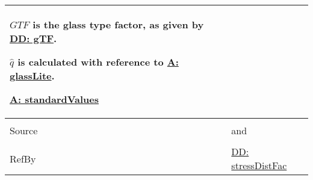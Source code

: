 \documentclass[12pt]{article}
\begin{document}
\begin{minipage}{\textwidth}
\begin{tabular}{>{\raggedright}p{}>{\raggedright\arraybackslash}p{}}
        $GTF$ is the glass type factor, as given by \hyperref[DD:gTF]{DD: gTF}.
        
        $\hat{q}$ is calculated with reference to \hyperref[assumpGL]{A: glassLite}.
        
        \hyperref[assumpSV]{A: standardValues}
        
\\ \midrule \\
Source & \cite{astm2009} and \cite[(Eq. 7)]{campidelli}
         
\\ \midrule \\
RefBy & \hyperref[DD:stressDistFac]{DD: stressDistFac}
        
\\ \bottomrule
\end{tabular}
\end{minipage}
\end{document}

